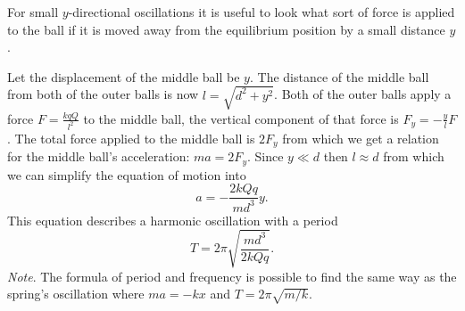 {\ifEngHint
For small $y$-directional oscillations it is useful to look what sort of force is applied to the ball if it is moved away from the equilibrium position by a small distance $y$.
\fi


\ifEngSolution
Let the displacement of the middle ball be $y$. The distance of the middle ball from both of the outer balls is now $l=\sqrt{d^2+y^2}$. Both of the outer balls apply a force $F=\frac{kqQ}{l^2}$ to the middle ball, the vertical component of that force is $F_y=-\frac{y}{l}F$. The total force applied to the middle ball is $2F_y$ from which we get a relation for the middle ball’s acceleration: $ma=2F_y$. Since $y\ll d$ then $l\approx d$ from which we can simplify the equation of motion into
\[
a=-\frac{2kQq}{md^3}y.
\] 
This equation describes a harmonic oscillation with a period
\[ T = 2\pi \sqrt{\frac{md^3}{2kQq}}.\] 
\emph{Note}. The formula of period and frequency is possible to find the same way as the spring’s oscillation where $ma = -kx$ and $T=2\pi \sqrt{m/k}$.
\fi
}